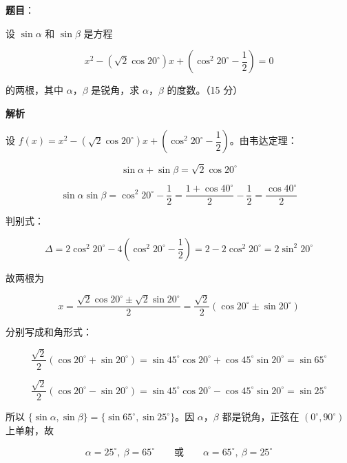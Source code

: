 \begin{answer}

\textbf{题目}：

设 $\sin\alpha$ 和 $\sin\beta$ 是方程

\nopagebreak[4]
\[
x^{2}-\left(\sqrt{2}\cos 20^\circ\right)x+\left(\cos^{2}20^\circ-\frac{1}{2}\right)=0
\]

的两根，其中 $\alpha$，$\beta$ 是锐角，求 $\alpha$，$\beta$ 的度数。（15 分）

\textbf{解析}

设 $f(x)=x^{2}-\left(\sqrt{2}\cos 20^\circ\right)x+\left(\cos^{2}20^\circ-\dfrac{1}{2}\right)$。由韦达定理：

\nopagebreak[4]
\[
\sin\alpha+\sin\beta=\sqrt{2}\cos 20^\circ
\]

\nopagebreak[4]
\[
\sin\alpha\sin\beta=\cos^{2}20^\circ-\frac{1}{2}=\frac{1+\cos 40^\circ}{2}-\frac{1}{2}=\frac{\cos 40^\circ}{2}
\]

判别式：

\nopagebreak[4]
\[
\Delta=2\cos^{2}20^\circ-4\left(\cos^{2}20^\circ-\frac{1}{2}\right)=2-2\cos^{2}20^\circ=2\sin^{2}20^\circ
\]

故两根为

\nopagebreak[4]
\[
x=\frac{\sqrt{2}\cos 20^\circ\pm\sqrt{2}\sin 20^\circ}{2}
=\frac{\sqrt{2}}{2}\left(\cos 20^\circ\pm\sin 20^\circ\right)
\]

分别写成和角形式：

\nopagebreak[4]
\[
\frac{\sqrt{2}}{2}\left(\cos 20^\circ+\sin 20^\circ\right)
=\sin 45^\circ\cos 20^\circ+\cos 45^\circ\sin 20^\circ=\sin 65^\circ
\]

\nopagebreak[4]
\[
\frac{\sqrt{2}}{2}\left(\cos 20^\circ-\sin 20^\circ\right)
=\sin 45^\circ\cos 20^\circ-\cos 45^\circ\sin 20^\circ=\sin 25^\circ
\]

所以 $\{\sin\alpha,\sin\beta\}=\{\sin 65^\circ,\sin 25^\circ\}$。因 $\alpha$，$\beta$ 都是锐角，正弦在 $(0^\circ,90^\circ)$ 上单射，故

\nopagebreak[4]
\[
\alpha=25^\circ,\ \beta=65^\circ\qquad\text{或}\qquad \alpha=65^\circ,\ \beta=25^\circ
\]


\end{answer}

